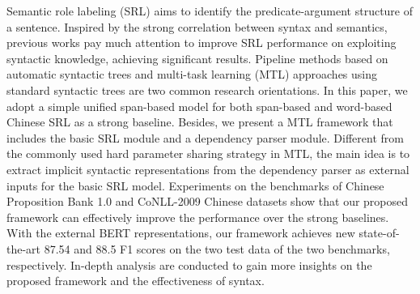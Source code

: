 Semantic role labeling (SRL) aims to identify the predicate-argument structure of a sentence.
Inspired by the strong correlation between syntax and semantics, previous works pay much attention to improve SRL performance on exploiting syntactic knowledge, achieving significant results.
Pipeline methods based on automatic syntactic trees and multi-task learning (MTL) approaches using standard syntactic trees are two common research orientations.
In this paper, we adopt a simple unified span-based model for both span-based and word-based Chinese SRL as a strong baseline.
Besides, we present a MTL framework that includes the basic SRL module and a dependency parser module.
Different from the commonly used hard parameter sharing strategy in MTL, the main idea is to extract implicit syntactic representations from the dependency parser as external inputs for the basic SRL model.
Experiments on the benchmarks of Chinese Proposition Bank 1.0 and CoNLL-2009 Chinese datasets show that our proposed framework can effectively improve the performance over the strong baselines.
With the external BERT representations, our framework achieves new state-of-the-art 87.54 and 88.5 F1 scores on the two test data of the two benchmarks, respectively.
In-depth analysis are conducted to gain more insights on the proposed framework and the effectiveness of syntax.